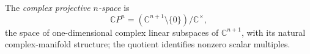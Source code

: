 
The \emph{complex projective $n$-space} is
\[
\mathbb CP^n=(\mathbb C^{n+1}\setminus\{0\})/\mathbb C^\times,
\]
the space of one-dimensional complex linear subspaces of $\mathbb C^{n+1}$, with its natural complex-manifold structure; the quotient identifies nonzero scalar multiples.

